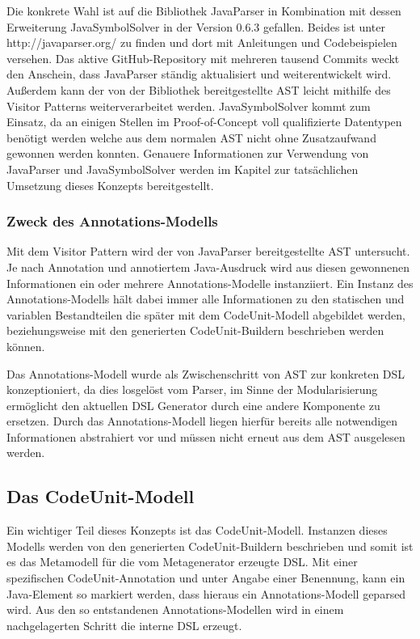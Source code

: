 \documentclass[12pt,oneside,a4paper,parskip]{scrbook}
\begin{document}
Die konkrete Wahl ist auf die Bibliothek JavaParser in Kombination mit dessen Erweiterung JavaSymbolSolver in der Version 0.6.3 gefallen. Beides ist unter http://javaparser.org/ zu finden und dort mit Anleitungen und Codebeispielen versehen. Das aktive GitHub-Repository mit mehreren tausend Commits weckt den Anschein, dass JavaParser ständig aktualisiert und weiterentwickelt wird. Außerdem kann der von der Bibliothek bereitgestellte AST leicht mithilfe des Visitor Patterns weiterverarbeitet werden. JavaSymbolSolver kommt zum Einsatz, da an einigen Stellen im Proof-of-Concept voll qualifizierte Datentypen benötigt werden welche aus dem normalen AST nicht ohne Zusatzaufwand gewonnen werden konnten. Genauere Informationen zur Verwendung von JavaParser und JavaSymbolSolver werden im Kapitel zur tatsächlichen Umsetzung dieses Konzepts bereitgestellt.

\subsubsection{Zweck des Annotations-Modells}

Mit dem Visitor Pattern wird der von JavaParser bereitgestellte AST untersucht. Je nach Annotation und annotiertem Java-Ausdruck wird aus diesen gewonnenen Informationen ein oder mehrere Annotations-Modelle instanziiert. Ein Instanz des Annotations-Modells hält dabei immer alle Informationen zu den statischen und variablen Bestandteilen die später mit dem CodeUnit-Modell abgebildet werden, beziehungsweise mit den generierten CodeUnit-Buildern beschrieben werden können.

Das Annotations-Modell wurde als Zwischenschritt von AST zur konkreten DSL konzeptioniert, da dies losgelöst vom Parser, im Sinne der Modularisierung ermöglicht den aktuellen DSL Generator durch eine andere Komponente zu ersetzen. Durch das Annotations-Modell liegen hierfür bereits alle notwendigen Informationen abstrahiert vor und müssen nicht erneut aus dem AST ausgelesen werden.

\subsection{Das CodeUnit-Modell}

Ein wichtiger Teil dieses Konzepts ist das CodeUnit-Modell. Instanzen dieses Modells werden von den generierten CodeUnit-Buildern beschrieben und somit ist es das Metamodell für die vom Metagenerator erzeugte DSL. Mit einer spezifischen CodeUnit-Annotation und unter Angabe einer Benennung, kann ein Java-Element so markiert werden, dass hieraus ein Annotations-Modell geparsed wird. Aus den so entstandenen Annotations-Modellen wird in einem nachgelagerten Schritt die interne DSL erzeugt.
\end{document}

